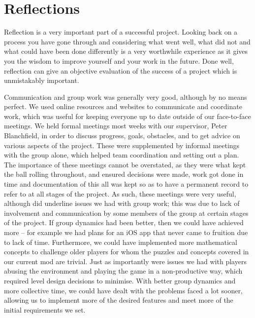 \chapter{Reflections}
\label{ch:reflections}
Reflection is a very important part of a successful project. Looking back on a process you 
have gone through and considering what went well, what did not and what could have been 
done differently is a very worthwhile experience as it gives you the wisdom to improve 
yourself and your work in the future. Done well, reflection can give an objective evaluation of the success of a project which is unmistakably important.\newline

Communication and group work was generally very good, although by no means perfect. We 
used online resources and websites to communicate and coordinate work, which was useful 
for keeping everyone up to date outside of our face-to-face meetings. We held formal 
meetings most weeks with our supervisor, Peter Blanchfield, in order to discuss progress, 
goals, obstacles, and to get advice on various aspects of the project. These were 
supplemented by informal meetings with the group alone, which helped team coordination 
and setting out a plan. The importance of these meetings cannot be overstated, as they 
were what kept the ball rolling throughout, and ensured decisions were made, work got done 
in time and documentation of this all was kept so as to have a permanent record to refer to 
at all stages of the project. As such, these meetings were very useful, although did underline issues we had with group work; this was due to lack of involvement and communication by some members of the group at certain stages of the project. If group dynamics had been better, then we could have achieved more – for example we had plans for an iOS app that never came to fruition due to lack of time. Furthermore, we could have implemented more mathematical concepts to challenge older players for whom the puzzles and concepts covered in our current mod are trivial. Just as importantly were issues we had with players abusing the environment and playing the game in a non-productive way, which required level design decisions to minimise. With better group dynamics and more collective time, we could have dealt with the problems faced a lot sooner, allowing us to implement more of the desired features and meet more of the initial requirements we set.\newline

